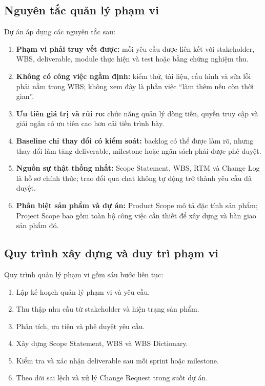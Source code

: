\subsection{Nguyên tắc quản lý phạm vi}

Dự án áp dụng các nguyên tắc sau:

\begin{enumerate}
  \item \textbf{Phạm vi phải truy vết được:} mỗi yêu cầu được liên kết với stakeholder, WBS, deliverable, module thực hiện và test hoặc bằng chứng nghiệm thu.
  \item \textbf{Không có công việc ngầm định:} kiểm thử, tài liệu, cấu hình và sửa lỗi phải nằm trong WBS; không xem đây là phần việc ``làm thêm nếu còn thời gian''.
  \item \textbf{Ưu tiên giá trị và rủi ro:} chức năng quản lý dòng tiền, quyền truy cập và giải ngân có ưu tiên cao hơn cải tiến trình bày.
  \item \textbf{Baseline chỉ thay đổi có kiểm soát:} backlog có thể được làm rõ, nhưng thay đổi làm tăng deliverable, milestone hoặc ngân sách phải được phê duyệt.
  \item \textbf{Nguồn sự thật thống nhất:} Scope Statement, WBS, RTM và Change Log là hồ sơ chính thức; trao đổi qua chat không tự động trở thành yêu cầu đã duyệt.
  \item \textbf{Phân biệt sản phẩm và dự án:} Product Scope mô tả đặc tính sản phẩm; Project Scope bao gồm toàn bộ công việc cần thiết để xây dựng và bàn giao sản phẩm đó.
\end{enumerate}

\subsection{Quy trình xây dựng và duy trì phạm vi}

Quy trình quản lý phạm vi gồm sáu bước liên tục:

\begin{enumerate}
  \item Lập kế hoạch quản lý phạm vi và yêu cầu.
  \item Thu thập nhu cầu từ stakeholder và hiện trạng sản phẩm.
  \item Phân tích, ưu tiên và phê duyệt yêu cầu.
  \item Xây dựng Scope Statement, WBS và WBS Dictionary.
  \item Kiểm tra và xác nhận deliverable sau mỗi sprint hoặc milestone.
  \item Theo dõi sai lệch và xử lý Change Request trong suốt dự án.
\end{enumerate}

